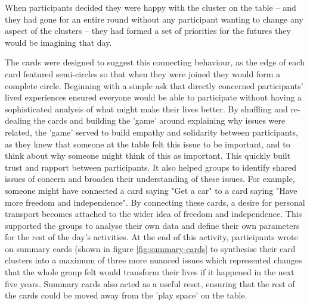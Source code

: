 When participants decided they were happy with the cluster on the table – and they had gone for an entire round without any participant wanting to change any aspect of the clusters – they had formed a set of priorities for the futures they would be imagining that day. 

The cards were designed to suggest this connecting behaviour, as the edge of each card featured semi-circles so that when they were joined they would form a complete circle. Beginning with a simple ask that directly concerned participants' lived experiences ensured everyone would be able to participate without having a sophisticated analysis of what might make their lives better. By shuffling and re-dealing the cards and building the 'game' around explaining why issues were related, the 'game' served to build empathy and solidarity between participants, as they knew that someone at the table felt this issue to be important, and to think about why someone might think of this as important. This quickly built trust and rapport between participants. It also helped groups to identify shared issues of concern and broaden their understanding of these issues. For example, someone might have connected a card saying "Get a car" to a card saying "Have more freedom and independence". By connecting these cards, a desire for personal transport becomes attached to the wider idea of freedom and independence. This supported the groups to analyse their own data and define their own parameters for the rest of the day's activities. At the end of this activity, participants wrote on summary cards (shown in figure \ref{fig:summary-cards} to synthesise their card clusters into a maximum of three more nuanced issues which represented changes that the whole group felt would transform their lives if it happened in the next five years. Summary cards also acted as a useful reset, ensuring that the rest of the cards could be moved away from the 'play space' on the table.
